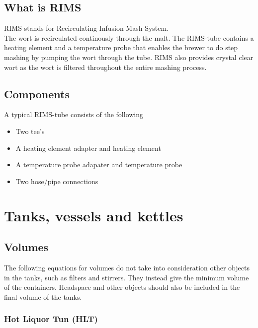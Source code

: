 \documentclass[11pt,fleqn,openany]{book} %
\begin{document}
\section{What is RIMS}

RIMS stands for Recirculating Infusion Mash System.\\
The wort is recirculated continously through the malt. The RIMS-tube contains a heating element and a temperature probe that enables the brewer to do step mashing by pumping the wort through the tube. RIMS also provides crystal clear wort as the wort is filtered throughout the entire mashing process.

\section{Components}

A typical RIMS-tube consists of the following

\begin{itemize}
\item Two tee's
\item A heating element adapter and heating element
\item A temperature probe adapater and temperature probe
\item Two hose/pipe connections
\end{itemize}



\chapter{Tanks, vessels and kettles}

\section{Volumes}

The following equations for volumes do not take into consideration other objects in the tanks, such as filters and stirrers. They instead give the minimum volume of the containers. Headspace and other objects should also be included in the final volume of the tanks.

\subsection{Hot Liquor Tun (HLT)}
\end{document}
